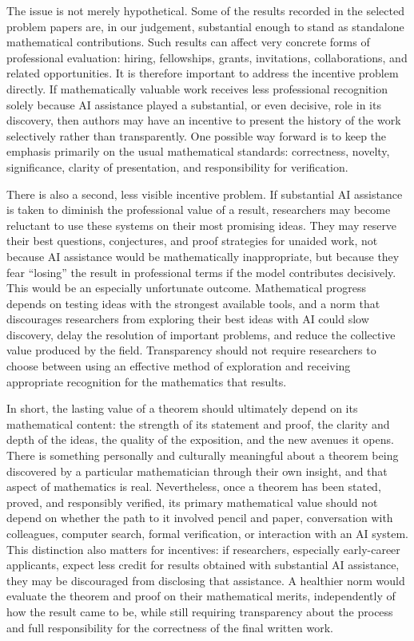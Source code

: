 \documentclass[11pt,reqno]{amsart}
\theoremstyle{plain}
\theoremstyle{definition}
\begin{document}
The issue is not merely hypothetical. Some of the results recorded in the selected problem papers are, in our judgement, substantial enough to stand as standalone mathematical contributions. Such results can affect very concrete forms of professional evaluation: hiring, fellowships, grants, invitations, collaborations, and related opportunities. It is therefore important to address the incentive problem directly. If mathematically valuable work receives less professional recognition solely because AI assistance played a substantial, or even decisive, role in its discovery, then authors may have an incentive to present the history of the work selectively rather than transparently. One possible way forward is to keep the emphasis primarily on the usual mathematical standards: correctness, novelty, significance, clarity of presentation, and responsibility for verification.

There is also a second, less visible incentive problem. If substantial AI assistance is taken to diminish the professional value of a result, researchers may become reluctant to use these systems on their most promising ideas. They may reserve their best questions, conjectures, and proof strategies for unaided work, not because AI assistance would be mathematically inappropriate, but because they fear “losing” the result in professional terms if the model contributes decisively. This would be an especially unfortunate outcome. Mathematical progress depends on testing ideas with the strongest available tools, and a norm that discourages researchers from exploring their best ideas with AI could slow discovery, delay the resolution of important problems, and reduce the collective value produced by the field. Transparency should not require researchers to choose between using an effective method of exploration and receiving appropriate recognition for the mathematics that results.

In short, the lasting value of a theorem should ultimately depend on its mathematical content: the strength of its statement and proof, the clarity and depth of the ideas, the quality of the exposition, and the new avenues it opens. There is something personally and culturally meaningful about a theorem being discovered by a particular mathematician through their own insight, and that aspect of mathematics is real. Nevertheless, once a theorem has been stated, proved, and responsibly verified, its primary mathematical value should not depend on whether the path to it involved pencil and paper, conversation with colleagues, computer search, formal verification, or interaction with an AI system. This distinction also matters for incentives: if researchers, especially early-career applicants, expect less credit for results obtained with substantial AI assistance, they may be discouraged from disclosing that assistance. A healthier norm would evaluate the theorem and proof on their mathematical merits, independently of how the result came to be, while still requiring transparency about the process and full responsibility for the correctness of the final written work.
\end{document}
